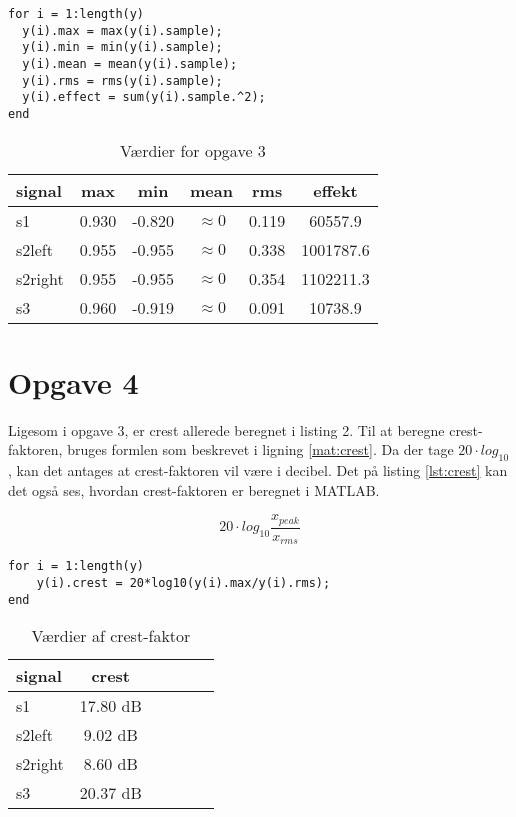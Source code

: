 \documentclass[../main.tex]{subfiles}
\begin{document}
\begin{lstlisting}[caption={Udsnit af beregning af max, min, gennemsnit (mean), rms og effekt}, label=lst:opg3]
for i = 1:length(y)
  y(i).max = max(y(i).sample);
  y(i).min = min(y(i).sample);
  y(i).mean = mean(y(i).sample);
  y(i).rms = rms(y(i).sample);
  y(i).effect = sum(y(i).sample.^2);
end
\end{lstlisting}

\begin{table}[H]
	\centering
	\caption{Værdier for opgave 3}
	\begin{tabular}{l|ccccc}
		\hline
		signal & max & min & mean & rms & effekt \\
		\hline
		s1 & 0.930 & -0.820 & $\approx 0$ & 0.119 & 60557.9 \\
		s2left & 0.955 & -0.955 & $\approx 0$ & 0.338 & 1001787.6  \\ 
		s2right & 0.955 & -0.955 & $\approx 0$ &	0.354 &	1102211.3 \\
		s3 & 0.960 &	-0.919 & $\approx 0$ & 0.091 &	10738.9 \\
	\end{tabular}
\end{table}


\section*{Opgave 4}

Ligesom i opgave 3, er crest allerede beregnet i listing 2. Til at beregne crest-faktoren, bruges formlen som beskrevet i ligning \ref{mat:crest}. Da der tage \(20\cdot log_{10}\), kan det antages at crest-faktoren vil være i decibel. Det på listing \ref{lst:crest} kan det også ses, hvordan crest-faktoren er beregnet i MATLAB. 

\begin{equation}
	\label{mat:crest}
	20\cdot log_{10}\frac{x_{peak}}{x_{rms}}
\end{equation}

\begin{lstlisting}[caption={Bergning af crest-faktor for alle 3 signaler}, label=lst:crest]
for i = 1:length(y)
	y(i).crest = 20*log10(y(i).max/y(i).rms);
end
\end{lstlisting}

\begin{table}[H]
	\centering
	\caption{Værdier af crest-faktor}
	\label{tab:crest}
	\begin{tabular}{l|ccccc}
		\hline
		signal & crest \\
		\hline
		s1 & 17.80 dB \\
		s2left & 9.02 dB \\ 
		s2right & 8.60 dB\\
		s3 & 20.37 dB
	\end{tabular}
\end{table}
\end{document}
